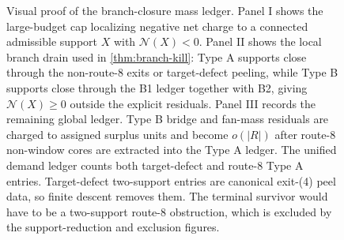 \documentclass[11pt]{article}
\newcommand{\No}{\mathcal N}
\begin{document}
\begin{figure}[t]
{%
}
\caption[Visual proof of the branch-closure mass ledger]{Visual proof of the branch-closure mass ledger.  Panel I shows the large-budget cap localizing negative net charge to a connected admissible support \(X\) with \(\No(X)<0\).  Panel II shows the local branch drain used in \cref{thm:branch-kill}: Type A supports close through the non-route-8 exits or target-defect peeling, while Type B supports close through the B1 ledger together with B2, giving \(\No(X)\ge0\) outside the explicit residuals.  Panel III records the remaining global ledger.  Type B bridge and fan-mass residuals are charged to assigned surplus units and become \(o(|R|)\) after route-8 non-window cores are extracted into the Type A ledger.  The unified demand ledger counts both target-defect and route-8 Type A entries.  Target-defect two-support entries are canonical exit-\textup{(4)} peel data, so finite descent removes them.  The terminal survivor would have to be a two-support route-8 obstruction, which is excluded by the support-reduction and exclusion figures.}
\label{fig:branch-closure-mass-ledger}
\end{figure}
\end{document}
